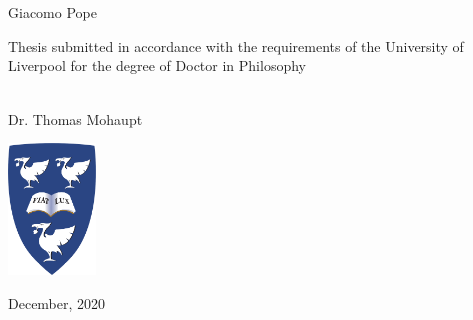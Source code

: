 \begin{titlepage}
\begin{addmargin}[0.5in]{0.5in}
    \begin{center}
        \large  

        \hfill
        
        \vspace{2cm}
        
        \begingroup
            \color{Maroon}\Large{} \\ \bigskip
        \endgroup
        
		\vspace{3cm}

         \\
        {Giacomo Pope} \\
        
        \vspace{3cm}

		{\normalsize{Thesis submitted in accordance with the requirements of the University of Liverpool for the degree of Doctor in Philosophy}}
        
        \vspace{2cm}
                
         \\ \smallskip
        Dr. Thomas Mohaupt \\ \smallskip
        
        \vspace{1.5cm}
        
        \includegraphics[height=3.5cm]{figures/uni_logo.png} 
        
        \vfill
        
        December, 2020                    

    \end{center}     
\end{addmargin}  
\end{titlepage}   